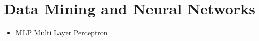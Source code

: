 \documentclass[../main/main.tex]{subfiles}
\begin{document}
\section{Data Mining and Neural Networks}
\begin{itemize}
\item MLP \hfill Multi Layer Perceptron
\end{itemize}
\end{document}
